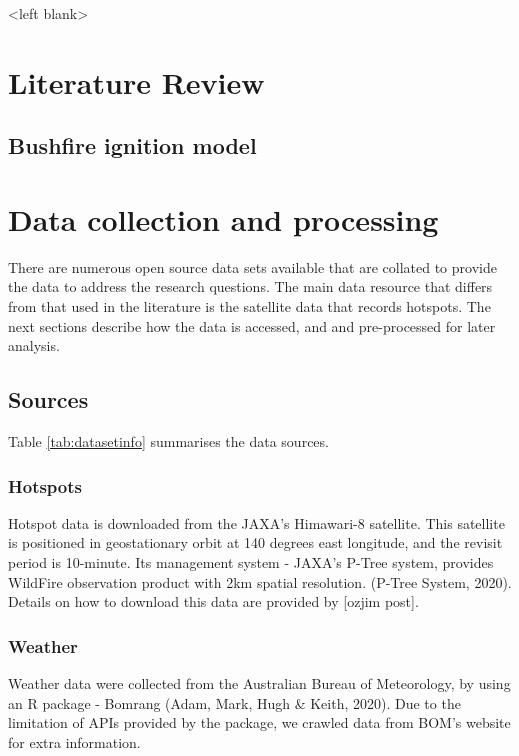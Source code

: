 \documentclass{monashthesis}
\begin{document}
\textless{}left blank\textgreater{}

\chapter{Literature Review}\label{literature-review}

\section{Bushfire ignition model}\label{bushfire-ignition-model}

\chapter{Data collection and
processing}\label{data-collection-and-processing}

There are numerous open source data sets available that are collated to
provide the data to address the research questions. The main data
resource that differs from that used in the literature is the satellite
data that records hotspots. The next sections describe how the data is
accessed, and and pre-processed for later analysis.

\section{Sources}\label{sources}

Table \ref{tab:datasetinfo} summarises the data sources.

\subsection{Hotspots}\label{hotspots}

Hotspot data is downloaded from the JAXA's Himawari-8 satellite. This
satellite is positioned in geostationary orbit at 140 degrees east
longitude, and the revisit period is 10-minute. Its management system -
JAXA's P-Tree system, provides WildFire observation product with 2km
spatial resolution. (P-Tree System, 2020). Details on how to download
this data are provided by {[}ozjim post{]}.

\subsection{Weather}\label{weather}

Weather data were collected from the Australian Bureau of Meteorology,
by using an R package - Bomrang (Adam, Mark, Hugh \& Keith, 2020). Due
to the limitation of APIs provided by the package, we crawled data from
BOM's website for extra information.
\end{document}
